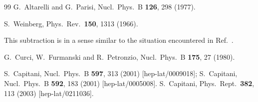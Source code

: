\begin{thebibliography}{99}
  G.~Altarelli and G.~Parisi,
  Nucl.\ Phys.\ B {\bf 126}, 298 (1977).


  S.~Weinberg,
  Phys.\ Rev.\  {\bf 150}, 1313 (1966).

{This subtraction is in a sense similar to the situation encountered in Ref.~\cite{Curci:1980uw}.}

  G.~Curci, W.~Furmanski and R.~Petronzio,
  Nucl.\ Phys.\ B {\bf 175}, 27 (1980).


  S.~Capitani,
  Nucl.\ Phys.\ B {\bf 597}, 313 (2001)
  [hep-lat/0009018]; %
  S.~Capitani,
  Nucl.\ Phys.\ B {\bf 592}, 183 (2001)
  [hep-lat/0005008].
  S.~Capitani,
  Phys.\ Rept.\  {\bf 382}, 113 (2003)
  [hep-lat/0211036].


\end{thebibliography}
